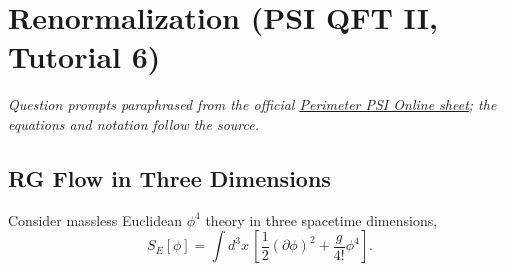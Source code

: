 \section{Renormalization (PSI QFT II, Tutorial 6)}

\noindent\textit{Question prompts paraphrased from the official
\href{https://psi-online.perimeterinstitute.ca/courses/take/quantum-field-theory-ii-student/pdfs/20776391-module-5-tutorial}{Perimeter PSI Online sheet};
the equations and notation follow the source.}

\subsection{RG Flow in Three Dimensions}

Consider massless Euclidean $\phi^4$ theory in three spacetime dimensions,
\begin{equation}
    S_E[\phi]
    =\int d^3x\,
    \left[
        \frac{1}{2}(\partial\phi)^2
        +\frac{g}{4!}\phi^4
    \right].
\end{equation}

